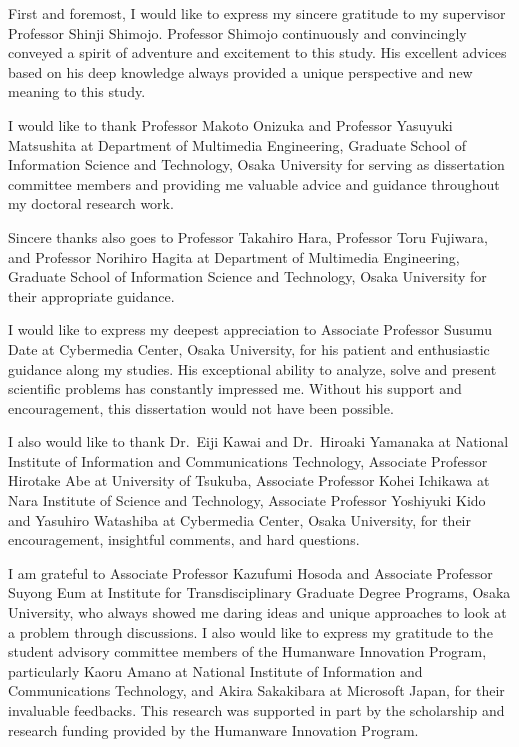 
First and foremost, I would like to express my sincere gratitude to my
supervisor Professor Shinji Shimojo. Professor Shimojo continuously and
convincingly conveyed a spirit of adventure and excitement to this study. His
excellent advices based on his deep knowledge always provided a unique
perspective and new meaning to this study.

I would like to thank Professor Makoto Onizuka and Professor Yasuyuki
Matsushita at Department of Multimedia Engineering, Graduate School of
Information Science and Technology, Osaka University for serving as
dissertation committee members and providing me valuable advice and guidance
throughout my doctoral research work.

Sincere thanks also goes to Professor Takahiro Hara, Professor Toru Fujiwara,
and Professor Norihiro Hagita at Department of Multimedia Engineering,
Graduate School of Information Science and Technology, Osaka University for
their appropriate guidance.

I would like to express my deepest appreciation to Associate Professor Susumu
Date at Cybermedia Center, Osaka University, for his patient and enthusiastic
guidance along my studies. His exceptional ability to analyze, solve and
present scientific problems has constantly impressed me. Without his support
and encouragement, this dissertation would not have been possible.

I also would like to thank Dr.~Eiji Kawai and Dr.~Hiroaki Yamanaka at National
Institute of Information and Communications Technology, Associate Professor
Hirotake Abe at University of Tsukuba, Associate Professor Kohei Ichikawa at
Nara Institute of Science and Technology, Associate Professor Yoshiyuki Kido
and Yasuhiro Watashiba at Cybermedia Center, Osaka University, for their
encouragement, insightful comments, and hard questions.

I am grateful to  Associate Professor Kazufumi Hosoda and Associate Professor
Suyong Eum at Institute for Transdisciplinary Graduate Degree Programs, Osaka
University, who always showed me daring ideas and unique approaches to look at
a problem through discussions. I also would like to express my gratitude to
the student advisory committee members of the Humanware Innovation Program,
particularly Kaoru Amano at National Institute of Information and
Communications Technology, and Akira Sakakibara at Microsoft Japan, for their
invaluable feedbacks. This research was supported in part by the scholarship
and research funding provided by the Humanware Innovation Program.

